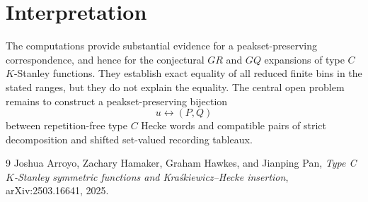 \documentclass{article}
\begin{document}
\section{Interpretation}

The computations provide substantial evidence for a peakset-preserving
correspondence, and hence for the conjectural \(GR\) and \(GQ\) expansions of type \(C\) \(K\)-Stanley functions.
They establish exact equality of all reduced finite bins in the stated ranges,
but they do not explain the equality.  The central open problem remains to
construct a peakset-preserving bijection
\[
  u\longleftrightarrow(P,Q)
\]
between repetition-free type \(C\) Hecke words and compatible pairs of strict
decomposition and shifted set-valued recording tableaux.

\begin{thebibliography}{9}
Joshua Arroyo, Zachary Hamaker, Graham Hawkes, and Jianping Pan,
\emph{Type C \(K\)-Stanley symmetric functions and
Kra\'skiewicz--Hecke insertion},
arXiv:2503.16641, 2025.
\end{thebibliography}
\end{document}
